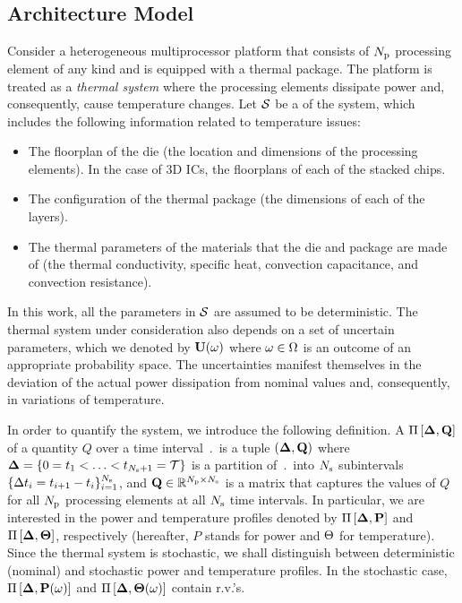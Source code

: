 \subsection{Architecture Model}  
Consider a heterogeneous multiprocessor platform that consists of ${N_\text{p}}$ processing element of any kind and is equipped with a thermal package. The platform is treated as a \emph{thermal system} where the processing elements dissipate power and, consequently, cause temperature changes. Let $\mathcal{S}$ be a  of the system, which includes the following information related to temperature issues:
\begin{itemize}
  \item The floorplan of the die (the location and dimensions of the processing elements). In the case of 3D ICs, the floorplans of each of the stacked chips.
  \item The configuration of the thermal package (the dimensions of each of the layers).
  \item The thermal parameters of the materials that the die and package are made of (the thermal conductivity, specific heat, convection capacitance, and convection resistance).
\end{itemize}
In this work, all the parameters in $\mathcal{S}$ are assumed to be deterministic. The thermal system under consideration also depends on a set of uncertain parameters, which we denoted by $\mathbf{U}(\omega)$ where $\omega \in \Omega$ is an outcome of an appropriate probability space. The uncertainties manifest themselves in the deviation of the actual power dissipation from nominal values and, consequently, in variations of temperature.

In order to quantify the system, we introduce the following definition. A  $\prof{\m{Q}}$ of a quantity $Q$ over a time interval $\period$ is a tuple $(\part, \m{Q})$ where $\boldsymbol{\Delta} = \{ 0 = t_1 < \dotsc < t_{N_\text{s} + 1} = \mathcal{T} \}$ is a partition of $\period$ into $N_\text{s}$ subintervals $\{ \Delta t_i = t_{i+1} - t_i \}_{i = 1}^{N_\text{s}}$, and $\m{Q} \in \real^{\cores \times \steps}$ is a matrix that captures the values of $Q$ for all ${N_\text{p}}$ processing elements at all $N_\text{s}$ time intervals. In particular, we are interested in the power and temperature profiles denoted by $\prof{\mP}$ and $\Pi\left[\boldsymbol{\Delta}, {\boldsymbol\Theta}\right]$, respectively (hereafter, $P$ stands for power and $\Theta$ for temperature). Since the thermal system is stochastic, we shall distinguish between deterministic (nominal) and stochastic power and temperature profiles. In the stochastic case, $\prof{\mP(\o)}$ and $\Pi\left[\boldsymbol{\Delta}, {\boldsymbol\Theta}(\omega)\right]$ contain r.v.'s.
